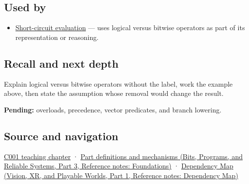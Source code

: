 \subsection{Used by}\label{appendix-fe6b457d68d8-used-by}

\hypertarget{appendix-fe6b457d68d8-used-by}{}

\begin{itemize}
\tightlist
\item
  \hyperref[appendix-2e245a6fa8d3]{Short-circuit evaluation} --- uses logical versus bitwise operators as part of its representation or reasoning.
\end{itemize}

\subsection{Recall and next depth}\label{appendix-fe6b457d68d8-recall-and-next-depth}

\hypertarget{appendix-fe6b457d68d8-recall-and-next-depth}{}

Explain logical versus bitwise operators without the label, work the example above, then state the assumption whose removal would change the result.

\textbf{Pending:} overloads, precedence, vector predicates, and branch lowering.

\subsection{Source and navigation}\label{appendix-fe6b457d68d8-source-and-navigation}

\hypertarget{appendix-fe6b457d68d8-source-and-navigation}{}

\hyperref[01-foundations-i-ch001-from-a-signal-to-an-interpretation]{C001 teaching chapter} · \href{../01-Bits-Programs-and-Reliable-Systems-P03/main.pdf\#nameddest=appendix-fd090d982a15}{Part definitions and mechanisms (Bits, Programs, and Reliable Systems, Part 3, Reference notes: Foundations)} · \href{../07-Vision-XR-and-Playable-Worlds-P01/main.pdf\#nameddest=appendix-4ad47bdd269a}{Dependency Map (Vision, XR, and Playable Worlds, Part 1, Reference notes: Dependency Map)}
